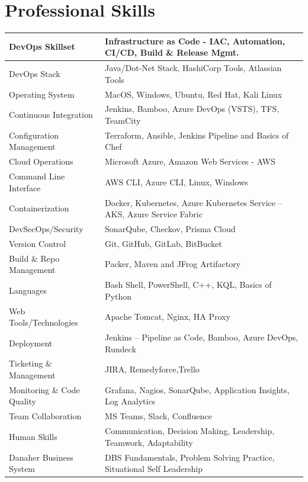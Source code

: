 \documentclass[11pt, a4paper]{article}
\begin{document}
\section*{\color{NavyBlue}Professional Skills}
\vspace{-1.5mm}
\noindent\begin{tabular}{|>{\columncolor[gray]{0.9}}p{1.8in}|p{4.7in}|}
\hline
DevOps Skillset & Infrastructure as Code - IAC, Automation, CI/CD, Build \& Release Mgmt. \\
\hline
DevOps Stack & Java/Dot-Net Stack, HashiCorp Tools, Atlassian Tools \\
\hline
Operating System & MacOS, Windows, Ubuntu, Red Hat, Kali Linux \\
\hline
Continuous Integration & Jenkins, Bamboo, Azure DevOps (VSTS), TFS, TeamCity \\
\hline
Configuration Management 	& Terraform, Ansible, Jenkins Pipeline and Basics of Chef \\
\hline
Cloud Operations 	& Microsoft Azure, Amazon Web Services - AWS \\
\hline
Command Line Interface & AWS CLI, Azure CLI, Linux, Windows \\
\hline
Containerization  & Docker, Kubernetes, Azure Kubernetes Service – AKS, Azure Service Fabric \\
\hline
DevSecOps/Security & SonarQube,  Checkov, Prisma Cloud \\
\hline
Version Control & Git, GitHub, GitLab, BitBucket \\
\hline
Build \& Repo Management  & Packer, Maven and JFrog Artifactory \\
\hline
Languages	 & Bash Shell, PowerShell, C++, KQL, Basics of Python \\
\hline
Web Tools/Technologies  & Apache Tomcat, Nginx, HA Proxy \\
\hline
Deployment & Jenkins – Pipeline as Code, Bamboo, Azure DevOps, Rundeck \\
\hline
Ticketing \& Management  & JIRA, Remedyforce,Trello \\
\hline
Monitoring \& Code Quality	 & Grafana, Nagios, SonarQube, Application Insights, Log Analytics \\
\hline
Team Collaboration & MS Teams, Slack, Confluence \\
\hline
Human Skills & Communication, Decision Making, Leadership, Teamwork, Adaptability \\
\hline
Danaher Business System &	DBS Fundamentals, Problem Solving Practice,  Situational Self Leadership\\
\hline
\end{tabular}
\end{document}

